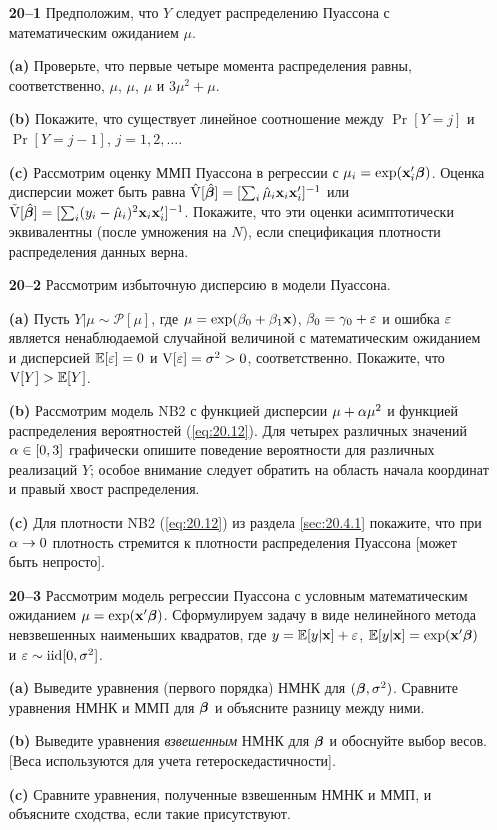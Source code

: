 \noindent
\begin{itemize}
    \item[\textbf{20--1}]
Предположим, что $Y$ следует распределению Пуассона с математическим ожиданием $\mu$.
        \item[\textbf{(a)}]
Проверьте, что первые четыре момента распределения равны, соответственно, $\mu$, $\mu$, $\mu$ и $3\mu^2 + \mu$.
        \item[\textbf{(b)}]
Покажите, что существует линейное соотношение между $\Pr[Y = j]$ и $\Pr[Y = j - 1]$, $j = 1, 2, \ldots $.
        \item[\textbf{(c)}]
Рассмотрим оценку ММП Пуассона в регрессии с $\mu_i = \exp(\mathbf{x}_i'\bm{\beta})$. Оценка дисперсии может быть равна $\hat{\mathrm{V}}[\hat{\bm{\beta}}] = [\sum_i \hat{\mu}_i \mathbf{x}_i \mathbf{x}'_i]^{-1}$ или $\tilde{\mathrm{V}}[\hat{\bm{\beta}}] = [\sum_i (y_i - \hat{\mu}_i)^2 \mathbf{x}_i \mathbf{x}'_i]^{-1}$.
Покажите, что эти оценки асимптотически эквивалентны (после умножения на $N$), если спецификация плотности распределения данных верна.

    \item[\textbf{20--2}]
Рассмотрим избыточную дисперсию в модели Пуассона.
        \item[\textbf{(a)}]
Пусть $Y|\mu \sim \mathcal{P}[\mu]$, где $\mu = \exp(\beta_0 + \beta_1\mathbf{x})$, $\beta_0 = \gamma_0 + \varepsilon$ и ошибка $\varepsilon$ является ненаблюдаемой случайной величиной с математическим ожиданием и дисперсией $\mathbb{E}[\varepsilon] = 0$ и $\mathrm{V}[\varepsilon] = \sigma^2 > 0$, соответственно. Покажите, что $\mathrm{V}[Y] > \mathbb{E}[Y]$.
        \item[\textbf{(b)}]
Рассмотрим модель NB2 с функцией дисперсии $\mu + \alpha \mu^2$ и функцией распределения вероятностей (\ref{eq:20.12}). Для четырех различных значений $\alpha \in [0, 3]$ графически опишите поведение вероятности для различных реализаций $Y$; особое внимание следует обратить на область начала координат и правый хвост распределения.
        \item[\textbf{(c)}]
Для плотности NB2 (\ref{eq:20.12}) из раздела \ref{sec:20.4.1} покажите, что при $\alpha \rightarrow 0$ плотность стремится к плотности распределения Пуассона [может быть непросто].

    \item[\textbf{20--3}]
Рассмотрим модель регрессии Пуассона с условным математическим ожиданием $\mu = \exp(\mathbf{x}'\bm{\beta})$. Сформулируем задачу в виде нелинейного метода невзвешенных наименьших квадратов, где $y = \mathbb{E}[y|\mathbf{x}] + \varepsilon$, $\mathbb{E}[y|\mathbf{x}] = \exp(\mathbf{x}'\bm{\beta})$ и $\varepsilon \sim \mathrm{iid}[0, \sigma^2]$.
        \item[\textbf{(a)}]
Выведите уравнения (первого порядка) НМНК для $(\bm{\beta}, \sigma^2)$. Сравните уравнения НМНК и ММП для $\bm{\beta}$ и объясните разницу между ними.
        \item[\textbf{(b)}]
Выведите уравнения \textit{взвешенным} НМНК для $\bm{\beta}$ и обоснуйте выбор весов. [Веса используются для учета гетероскедастичности].
        \item[\textbf{(c)}]
Сравните уравнения, полученные взвешенным НМНК и ММП, и объясните сходства, если такие присутствуют.


\end{itemize}

